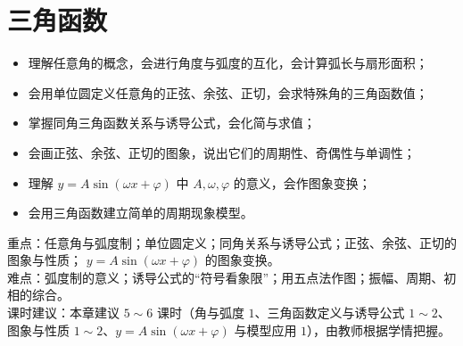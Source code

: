 \chapter{三角函数}

\begin{objective}
\begin{itemize}
  \item 理解任意角的概念，会进行角度与弧度的互化，会计算弧长与扇形面积；
  \item 会用单位圆定义任意角的正弦、余弦、正切，会求特殊角的三角函数值；
  \item 掌握同角三角函数关系与诱导公式，会化简与求值；
  \item 会画正弦、余弦、正切的图象，说出它们的周期性、奇偶性与单调性；
  \item 理解 $y=A\sin(\omega x+\varphi)$ 中 $A,\omega,\varphi$ 的意义，会作图象变换；
  \item 会用三角函数建立简单的周期现象模型。
\end{itemize}
\end{objective}

\begin{keypoint}
重点：任意角与弧度制；单位圆定义；同角关系与诱导公式；正弦、余弦、正切的图象与性质；
$y=A\sin(\omega x+\varphi)$ 的图象变换。\\
难点：弧度制的意义；诱导公式的“符号看象限”；用五点法作图；振幅、周期、初相的综合。\\
课时建议：本章建议 $5\sim6$ 课时（角与弧度 $1$、三角函数定义与诱导公式 $1\sim2$、
图象与性质 $1\sim2$、$y=A\sin(\omega x+\varphi)$ 与模型应用 $1$），由教师根据学情把握。
\end{keypoint}

